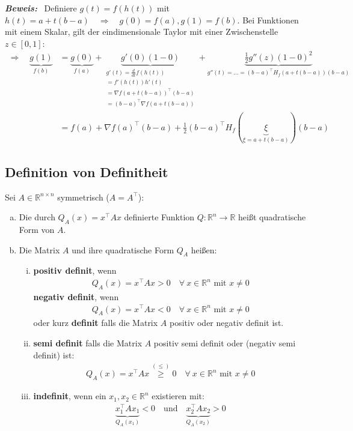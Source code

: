 \documentclass[11pt,a4paper]{book}
\newcommand {\R}	{\mathbb{R}}
\newcommand {\Rn}	{\mathbb{R}^n}
\newcommand {\Rnxn}	{\mathbb{R}^{n \times n}}
\newcommand{\1}    	{\mathbbm{1}}
\newcommand{\mitt}	{\textrm{ mit }}
\newcommand{\Beweis}[1][Beweis]
{\begin{mdframed}[backgroundcolor=gray!10,linewidth=0pt]\noindent\textit{\textbf{{#1}:}}~}
\newcommand{\QED}	{\end{mdframed}}
\begin{document}
\Beweis
Definiere \(g(t) = f(h(t))\) mit \(h(t) = a + t(b-a) \quad\Rightarrow\quad g(0) = f(a), g(1) = f(b)\). Bei Funktionen mit einem Skalar, gilt der eindimensionale Taylor mit einer Zwischenstelle \(z \in [0,1]\):
\begin{align*}
	\Rightarrow \quad \underbrace{g(1)}_{f(b)} &= \underbrace{g(0)}_{f(a)} + 
	\underbrace{g'(0)(1-0)}_{\substack{
		g'(t) = \frac{d}{dt} f(h(t)) \\
		= f'(h(t))h'(t) \\
		= \nabla f(a + t(b-a))^\top (b-a) \\
		= (b-a)^\top \nabla f(a + t(b-a)) 
	}} + 
	\underbrace{\frac{1}{2} g''(z)(1-0)^2}_{
		g''(t) = ... = (b-a)^\top H_f(a + t(b-a))(b-a)
	} \\
	&= f(a) + \nabla f(a)^\top (b-a) + \frac{1}{2} (b-a)^\top H_f(\underbrace{\xi}_{\xi = a + t(b-a)})(b-a)
\end{align*}
\QED

\subsection{Definition von Definitheit}
Sei \(A \in \Rnxn\) symmetrisch (\(A = A^\top\)):
\begin{enumerate}[a.~]
	\item Die durch \(Q_A(x) = x^\top A x\) definierte Funktion \(Q: \Rn \rightarrow \R\) heißt quadratische Form von \(A\).
	\item Die Matrix \(A\) und ihre quadratische Form \(Q_A\) heißen:
	\begin{enumerate}[(i)]
		\item \textbf{positiv definit}, wenn
		\begin{align*}
			Q_A(x) = x^\top A x > 0 \quad \forall~ x \in \Rn \mitt x \neq 0
		\end{align*}
		\textbf{negativ definit}, wenn
		\begin{align*}
			Q_A(x) = x^\top A x < 0 \quad \forall~ x \in \Rn \mitt x \neq 0
		\end{align*}
		oder kurz \textbf{definit} falls die Matrix \(A\) positiv oder negativ definit ist.
		\item \textbf{semi definit} falls die Matrix \(A\) 
		positiv semi definit oder (negativ semi definit) ist:
		\begin{align*}
			Q_A(x) = x^\top A x \stackrel{(\leqslant)}{\geqslant} 0 \quad \forall~ x \in \Rn \mitt x \neq 0
		\end{align*}
		\item \textbf{indefinit}, wenn ein \(x_1, x_2 \in \Rn\) existieren mit:
		\begin{align*}
			\underbrace{x_1^\top A x_1}_{Q_A(x_1)} < 0
			\quad \textrm{und} \quad 
			\underbrace{x_2^\top A x_2}_{Q_A(x_2)} > 0
		\end{align*}
	\end{enumerate}
\end{enumerate}
\end{document}
